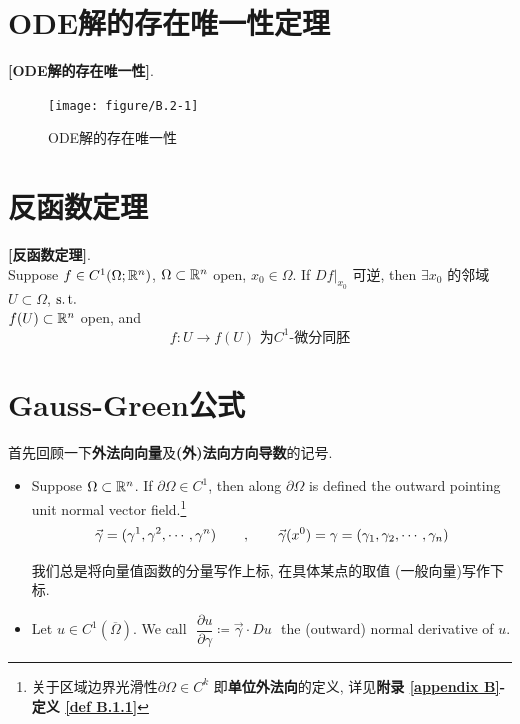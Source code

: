 \newpage

\section{ODE解的存在唯一性定理}
	\begin{thm}\label{thm B.2.1}
		\textbf{[ODE解的存在唯一性]}.
	\end{thm}
	
	\begin{figure}[thbp!]
		\centering
		\texttt{[image: figure/B.2-1]}
		\caption{ODE解的存在唯一性}
		\label{pic : B.2-1} %
	\end{figure}

\newpage

\section{反函数定理}
	\begin{thm}\label{thm B.3.1}
		\textbf{[反函数定理]}. \\
		Suppose $f \in C^{1}(\Omega ; \mathbb{R}^n)$, $\Omega \subset \mathbb{R}^n$ open, $x_0 \in \Omega$. If $Df|_{x_0}$ 可逆, then $\exists x_0$ 的邻域$U \subset \Omega$, $\operatorname{s.t.}$ \\
		$f(U) \subset \mathbb{R}^n$ open, and
		\[ f : U \longrightarrow f(U) \,\, \textbf{为$C^1$-微分同胚} \]
	\end{thm}

\newpage

\section{Gauss-Green公式}
	首先回顾一下\textbf{外法向向量}及\textbf{(外)法向方向导数}的记号.
	\begin{itemize}
		\item Suppose $\Omega \subset \mathbb{R}^n$. If $\partial \Omega \in C^1$, then along $\partial \Omega$ is defined the outward pointing unit normal vector field.\footnote{关于区域边界光滑性$\partial \Omega \in C^k$ 即\textbf{单位外法向}的定义, 详见\textbf{附录 \ref{appendix B}-定义 \ref{def B.1.1}}}
		\[ \vec{\gamma} = (\gamma^1 , \gamma^2 , \cdots , \gamma^n) 
		\hspace*{2em} , \hspace*{2em} 
		\vec{\gamma}(x^0) = \gamma = (\gamma_1 , \gamma_2 , \cdots , \gamma_n) \]
	
		\begin{rmk}
			我们总是将向量值函数的分量写作上标, 在具体某点的取值 (一般向量)写作下标.
		\end{rmk}
	
		\vspace{2em}
	
		\item Let $u \in C^{1}(\overline{\Omega})$. We call $\,\, \dfrac{\partial u}{\partial \gamma} \coloneqq \vec{\gamma} \cdot Du \,\,$ the (outward) normal derivative of $u$.
	\end{itemize}


